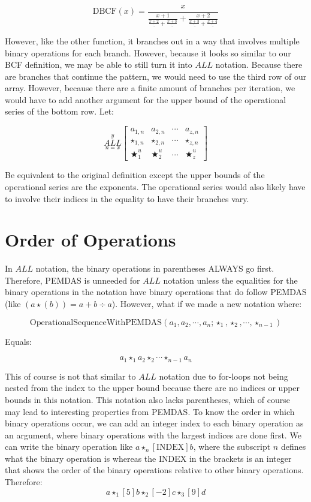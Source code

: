 \documentclass{article}
\begin{document}
$$\text{DBCF}(x)=\frac{x}{\frac{x+1}{\frac{x+2}{\ddots}+\frac{x+3}{\ddots}}+\frac{x+2}{\frac{x+3}{\ddots}+\frac{x+4}{\ddots}}}$$

However, like the other function, it branches out in a way that involves multiple binary operations for each branch. However, because it looks so similar to our BCF definition, we may be able to still turn it into $ALL$ notation. Because there are branches that continue the pattern, we would need to use the third row of our array. However, because there are a finite amount of branches per iteration, we would have to add another argument for the upper bound of the operational series of the bottom row. Let:

$$\underset{n=x}{\overset{y}{ALL}}
\begin{bmatrix}
a_{1,n} & a_{2,n} & \cdots & a_{z,n} \\
\star_{1,n} & \star_{2,n} & \cdots & \star_{z,n} \\ \bigstar_{1}^u & \bigstar_{2}^u & \cdots & \bigstar_{z}^u
\end{bmatrix}$$

Be equivalent to the original definition except the upper bounds of the operational series are the exponents. The operational series would also likely have to involve their indices in the equality to have their branches vary.

\section{Order of Operations}

In $ALL$ notation, the binary operations in parentheses ALWAYS go first. Therefore, PEMDAS is unneeded for $ALL$ notation unless the equalities for the binary operations in the notation have binary operations that do follow PEMDAS (like $(a\star(b))=a+ b \div a$). However, what if we made a new notation where:

$$\text{OperationalSequenceWithPEMDAS}(a_1,a_2,\cdots,a_n;\star_1,\star_2,\cdots,\star_{n-1})$$

Equals:

$$a_1 \star_1 a_2 \star_2 \cdots \star_{n-1} a_n$$

This of course is not that similar to $ALL$ notation due to for-loops not being nested from the index to the upper bound because there are no indices or upper bounds in this notation. This notation also lacks parentheses, which of course may lead to interesting properties from PEMDAS. To know the order in which binary operations occur, we can add an integer index to each binary operation as an argument, where binary operations with the largest indices are done first. We can write the binary operation like $a \star_n [\text{INDEX}] b$, where the subscript $n$ defines what the binary operation is whereas the INDEX in the brackets is an integer that shows the order of the binary operations relative to other binary operations. Therefore:
$$a \star_1[5] b \star_2 [-2] c \star_3 [9] d$$
\end{document}

